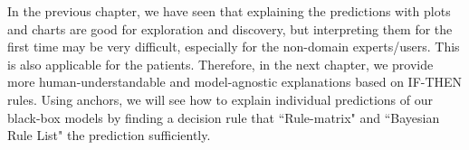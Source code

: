 
\hspace*{3.5mm} In the previous chapter, we have seen that explaining the predictions with plots and charts are good for exploration and discovery, but interpreting them for the first time may be very difficult, especially for the non-domain experts/users. This is also applicable for the patients. Therefore, in the next chapter, we provide more human-understandable and model-agnostic explanations based on IF-THEN rules. Using anchors, we will see how to explain individual predictions of our black-box models by finding a decision rule that ``Rule-matrix" and ``Bayesian Rule List" the prediction sufficiently. 

